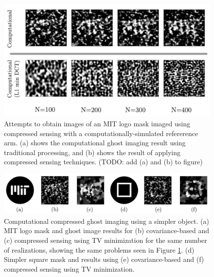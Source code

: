 \begin{figure}[t]
\begin{center}
\includegraphics[width=13cm]{figure-ghost-compressed-czl1.pdf}
\caption{Attempts to obtain images of an MIT logo mask imaged using compressed sensing with a computationally-simulated refererence arm. (a) shows the computational ghost imaging result using traditional processing, and (b) shows the result of applying compressed sensing techniques. (TODO: add (a) and (b) to figure)}
\label{figure:ghost-compressed-czl1}
\end{center}
\end{figure}

\begin{figure}[t]
\begin{center}
\includegraphics[width=15cm]{figure-ghost-ccgi.pdf}
\caption{Computational compressed ghost imaging using a simpler object. (a) MIT logo mask and ghost image results for (b) covariance-based and (c) compressed sensing using TV minimization for the same number of realizations, showing the same problems seen in Figure \ref{figure:ghost-compressed-czl1}. (d) Simpler square mask and results using (e) covariance-based and (f) compressed sensing using TV minimization.}
\label{figure:ghost-ccgi}
\end{center}
\end{figure}

